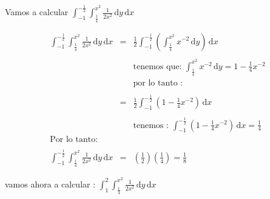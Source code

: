 \documentclass[12pt]{article}
\begin{document}
    \begin{flushleft}
        Vamos a calcular $\displaystyle \int_{-1}^{- \frac{1}{2}} \int_{\frac{1}{4}}^{x^2} \frac{1}{2x^2} \,\mathrm{d}y  \,\mathrm{d}x $
    \end{flushleft}

    \begin{equation*}
        \begin{array}{rcl}
            \displaystyle \int_{-1}^{- \frac{1}{2}} \int_{\frac{1}{4}}^{x^2} \frac{1}{2x^2} \,\mathrm{d}y  \,\mathrm{d}x  & = & \displaystyle  \frac{1}{2} \int_{-1}^{- \frac{1}{2}} \left(\int_{\frac{1}{4}}^{x^2}x^{-2}\,\mathrm{d}y \right) \,\mathrm{d}x 
            \\
            \\
            && \mbox{tenemos que: $\displaystyle \int_{\frac{1}{4}}^{x^2}x^{-2}\,\mathrm{d}y  = 1 - \frac{1}{4} x^{-2}$} 
            \\
            && \mbox{por lo tanto : }
            \\
            \\
            & = & \displaystyle  \frac{1}{2} \int_{-1}^{- \frac{1}{2}} \left(1 - \frac{1}{4} x^{-2}\right) \,\mathrm{d}x 
            \\
            \\
            && \mbox{tenemos : $\displaystyle  \int_{-1}^{- \frac{1}{2}} \left(1 - \frac{1}{4} x^{-2}\right) \,\mathrm{d}x = \frac{1}{4} $}
            \\
            \mbox{Por lo tanto: }
            \\
            \\
            \displaystyle \int_{-1}^{- \frac{1}{2}} \int_{\frac{1}{4}}^{x^2} \frac{1}{2x^2} \,\mathrm{d}y  \,\mathrm{d}x & = & \displaystyle \left(\frac{1}{2} \right) \left(\frac{1}{4}\right) = \frac{1}{8}
        \end{array}
    \end{equation*}

    \begin{flushleft}
        vamos ahora a calcular : $\displaystyle \int_{1}^{2} \int_{\frac{1}{4}}^{x^2} \frac{1}{2x^2} \,\mathrm{d}y  \,\mathrm{d}x$
    \end{flushleft}
\end{document}
